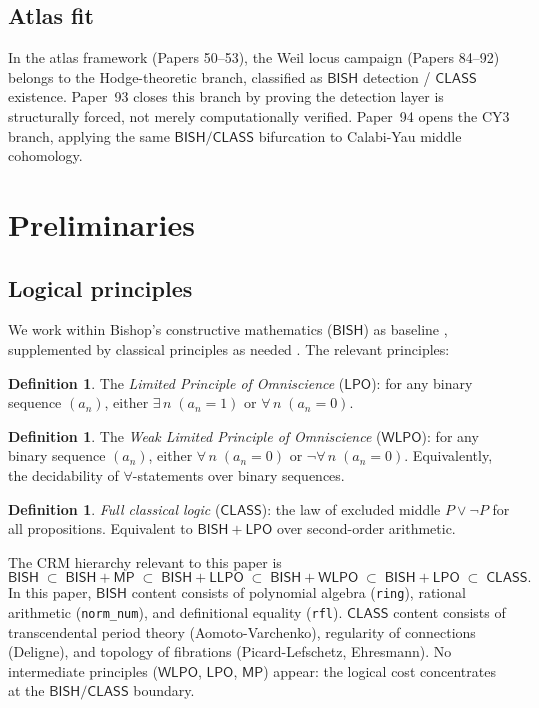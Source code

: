 \documentclass[11pt]{article}
\theoremstyle{plain}
\theoremstyle{definition}
\newtheorem{definition}[theorem]{Definition}
\theoremstyle{remark}
\newcommand{\BISH}{\mathsf{BISH}}
\newcommand{\CLASS}{\mathsf{CLASS}}
\newcommand{\WLPO}{\mathsf{WLPO}}
\newcommand{\LPO}{\mathsf{LPO}}
\begin{document}
\subsection{Atlas fit}

In the atlas framework (Papers 50--53), the Weil locus campaign
(Papers 84--92) belongs to the Hodge-theoretic branch, classified as
$\BISH$ detection / $\CLASS$ existence.
Paper~93 closes this branch by proving the detection layer is
structurally forced, not merely computationally verified.
Paper~94 \cite{p94} opens the CY3 branch, applying the same
$\BISH/\CLASS$ bifurcation to Calabi-Yau middle cohomology.


\section{Preliminaries}\label{sec:prelim}

\subsection{Logical principles}

We work within Bishop's constructive mathematics ($\BISH$)
as baseline \cite{bishop}, supplemented by classical principles as
needed \cite{bridges-richman}.  The relevant principles:

\begin{definition}\label{def:lpo}
The \emph{Limited Principle of Omniscience} ($\LPO$): for any binary
sequence $(a_n)$, either $\exists\, n\; (a_n = 1)$ or $\forall\, n\; (a_n = 0)$.
\end{definition}

\begin{definition}\label{def:wlpo}
The \emph{Weak Limited Principle of Omniscience} ($\WLPO$): for any binary
sequence $(a_n)$, either $\forall\,n\;(a_n = 0)$ or $\lnot\forall\,n\;(a_n = 0)$.
Equivalently, the decidability of $\forall$-statements over binary sequences.
\end{definition}

\begin{definition}\label{def:class}
\emph{Full classical logic} ($\CLASS$): the law of excluded middle
$P \vee \lnot P$ for all propositions.  Equivalent to $\BISH + \LPO$
over second-order arithmetic.
\end{definition}

The CRM hierarchy relevant to this paper is
\[
  \BISH \;\subset\; \BISH{+}\mathsf{MP} \;\subset\;
  \BISH{+}\mathsf{LLPO} \;\subset\; \BISH{+}\WLPO \;\subset\;
  \BISH{+}\LPO \;\subset\; \CLASS.
\]
In this paper, $\BISH$ content consists of polynomial algebra
(\texttt{ring}), rational arithmetic (\texttt{norm\_num}), and
definitional equality (\texttt{rfl}).  $\CLASS$ content consists of
transcendental period theory (Aomoto-Varchenko), regularity of
connections (Deligne), and topology of fibrations (Picard-Lefschetz,
Ehresmann).  No intermediate principles ($\WLPO$, $\LPO$, $\mathsf{MP}$)
appear: the logical cost concentrates at the $\BISH/\CLASS$ boundary.
\end{document}
